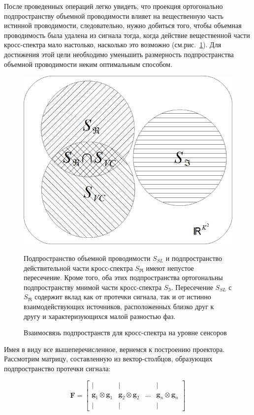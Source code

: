 После проведенных операций легко увидеть, что проекция ортогонально подпространству объемной проводимости
влияет на вещественную часть истинной проводимости, следовательно, нужно добиться того,
чтобы объемная проводимость была удалена из сигнала тогда,
когда действие вещественной части кросс-спектра мало настолько,
насколько это возможно (см.рис.~\ref{fig:subspaces}).
Для достижения этой цели необходимо уменьшить размерность подпространства
объемной проводимости неким оптимальным способом.

\begin{figure}[htbp]
\centering
\includegraphics[width=12cm]{./images/SetsReImVC.jpg}
\caption{Взаимосвязь подпространств для кросс-спектра на уровне сенсоров}
\medskip
\small
Подпространство объемной проводимости $S_{SL}$ и подпространство действительной части кросс-спектра $S_{\Re}$
имеют непустое пересечение. Кроме того, оба этих подпространства ортогональны подпространству мнимой
части кросс-спектра $S_{\Im}$.
Пересечение $S_{SL}$ с $S_{\Re}$ содержит вклад как от протечки сигнала,
так и от истинно взаимодействующих источников,
расположенных близко друг к другу и характеризующихся малой разностью фаз.
\label{fig:subspaces}
\end{figure}%
Имея в виду все вышеперечисленное, вернемся к построению проектора.
Рассмотрим матрицу, составленную из вектор-столбцов, образующих подпространство протечки сигнала:

\begin{equation}
    \mathbf{F} = 
    \begin{bmatrix}
        |                                 & |                                 &       & |                                 \\
        \mathbf{g}_1 \otimes \mathbf{g}_1 & \mathbf{g}_2 \otimes \mathbf{g}_2 & \dots & \mathbf{g}_n \otimes \mathbf{g}_n \\
        |                                 & |                                 &       & | 
    \end{bmatrix}
\end{equation} 

